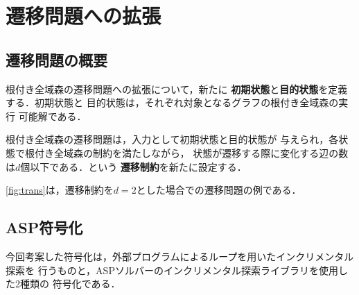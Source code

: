 \section{遷移問題への拡張}


\subsection{遷移問題の概要}
根付き全域森の遷移問題への拡張について，新たに
\textbf{初期状態}と\textbf{目的状態}を定義する．初期状態と
目的状態は，それぞれ対象となるグラフの根付き全域森の実行
可能解である．

根付き全域森の遷移問題は，入力として初期状態と目的状態が
与えられ，各状態で根付き全域森の制約を満たしながら，
状態が遷移する際に変化する辺の数は$d$個以下である．という
\textbf{遷移制約}を新たに設定する．

\ref{fig:trans}は，遷移制約を$d=2$とした場合での遷移問題の例である．

\begin{comment}
\begin{figure}[htbp]
 \centering
 \begin{subfigure}{}
  \centering
  
  \caption{$t=0$ (初期状態)}
 \end{subfigure}
 \hspace{1cm}
 \begin{subfigure}{}
  \centering
  
  \caption{$t=1$}
 \end{subfigure}
 \begin{subfigure}{}
  \centering
  
  \caption{$t=3$ (目的状態)}
 \end{subfigure}
 \hspace{1cm}
 \begin{subfigure}{}
  \centering
  
  \caption{$t=2$}
 \end{subfigure}
 \caption{実行例(コード\ref{code:transition.log})のグラフ表現}
 \label{fig:result-trans}
\end{figure}
\end{comment}

\subsection{ASP符号化}
今回考案した符号化は，外部プログラムによるループを用いたインクリメンタル探索を
行うものと，ASPソルバー{\clingo}のインクリメンタル探索ライブラリを使用した2種類の
符号化である．

